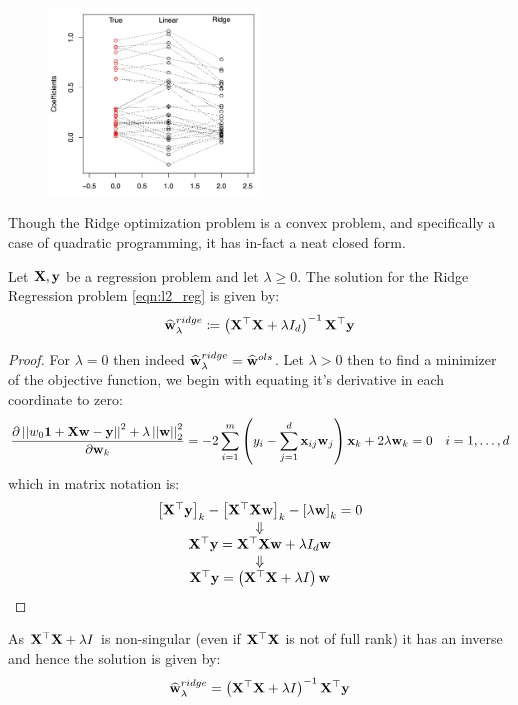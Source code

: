 \begin{figure}[!h]
	\centering
	\includegraphics[width=0.5\textwidth]{chapters/regularization.model.selection/figures/ridge_coefs.jpeg}
	\caption{}
\end{figure}

Though the Ridge optimization problem is a convex problem, and specifically a case of quadratic programming, it has in-fact a neat closed form.

\begin{theorem}
Let $\mathbf{X},\mathbf{y}$ be a regression problem and let $\lambda\geq 0$. The solution for the Ridge Regression problem \ref{eqn:l2_reg} is given by: $$ \widehat{\mathbf{w}}^{ridge}_{\lambda}\coloneqq \left(\mathbf{X}^\top \mathbf{X} + \lambda I_d\right)^{-1}\mathbf{X}^\top\mathbf{y} $$
\end{theorem}
\begin{proof}
For $\lambda=0$ then indeed $\widehat{\mathbf{w}}^{ridge}_{\lambda}=\widehat{\mathbf{w}}^{ols}$. Let $\lambda>0$ then to find a minimizer of the objective function, we begin with equating it's derivative in each coordinate to zero: 
$$ \frac{\partial \left|\left| w_0\mathbf{1} + \mathbf{X}\mathbf{w} - \mathbf{y}\right|\right|^2 + \lambda\left|\left| \mathbf{w}\right|\right|_2^2}{\partial \mathbf{w}_k}= -2\sum^m_{i=1} \left(y_i-\sum^d_{j=1}\mathbf{x}_{ij}\mathbf{w}_j\right)\mathbf{x}_k + 2\lambda \mathbf{w}_k = 0\quad i=1,\ldots,d $$
which in matrix notation is:
$$
\begin{array}{c}
\left[\mathbf{X}^{\top}\mathbf{y}\right]_{k}-\left[\mathbf{X}^{\top}\mathbf{X}\mathbf{w}\right]_{k}-\left[\lambda\mathbf{w}\right]_{k}=0\\
\Downarrow\\
\mathbf{X}^{\top}\mathbf{y}=\mathbf{X}^{\top}\mathbf{X}\mathbf{w}+\lambda I_{d}\mathbf{w}\\
\Downarrow\\
\mathbf{X}^{\top}\mathbf{y}=\left(\mathbf{X}^{\top}\mathbf{X}+\lambda I\right)\mathbf{w}
\end{array}
$$
\end{proof}
As $\mathbf{X}^\top \mathbf{X}+\lambda I$ is non-singular (even if $\mathbf{X}^\top \mathbf{X}$ is not of full rank) it has an inverse and hence the solution is given by: $$\widehat{\mathbf{w}}^{ridge}_{\lambda}=\left(\mathbf{X}^{\top}\mathbf{X}+\lambda I\right)^{-1}\mathbf{X}^\top\mathbf{y} $$

